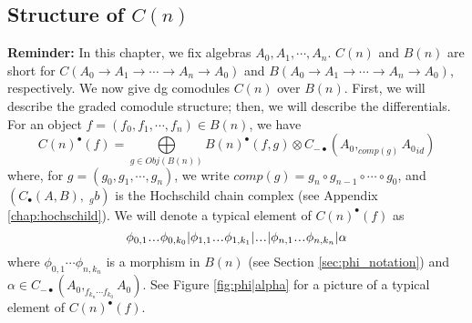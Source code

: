 \subsection{Structure of $C(n)$}
\textbf{Reminder:} In this chapter, we fix algebras $A_0, A_1, \cdots, A_n$.
$C(n)$ and $B(n)$ are short for $C(A_0 \to A_1 \to \cdots \to A_n \to A_0)$
and $B(A_0 \to A_1 \to \cdots \to A_n \to A_0)$, respectively.
\newline
\newline
We now give dg comodules $C(n)$ over $B(n)$.
First, we will describe the graded comodule structure;
then, we will describe the differentials.
For an object $f = (f_0, f_1, \cdots, f_n) \in B(n)$, we have
%
\begin{equation}\label{eq:C(f)}
C(n)^\bullet(f) 
= \bigoplus\limits_{g \in Obj(B(n))} B(n)^\bullet(f,g) \otimes 
C_{-\bullet}(A_0, _{comp(g)}{A_0}_{id})
\end{equation}
%
where, for $g = (g_0, g_1, \cdots, g_n)$, 
we write $comp(g) = g_n \circ g_{n-1} \circ \cdots \circ g_0$,
and $(C_\bullet(A,B),\; _gb)$ is the 
Hochschild chain complex 
(see Appendix \ref{chap:hochschild}).
We will denote a typical element of $C(n)^\bullet(f)$ 
as $$\phi_{0,1}\smdots\phi_{0,k_0} | 
\phi_{1,1}\smdots\phi_{1,k_1} | \smdots |
\phi_{n,1}\smdots\phi_{n,k_n} | \alpha$$
where $\phi_{0,1}\cdots \phi_{n,k_n}$ is a morphism
in $B(n)$ (see Section \ref{sec:phi_notation}) and
$\alpha \in C_{-\bullet}(A_0, _{f_{k_n}\cdots f_{k_0}}{A_0})$.
See Figure \ref{fig:phi|alpha} for a picture of 
a typical element of $C(n)^\bullet(f)$.
